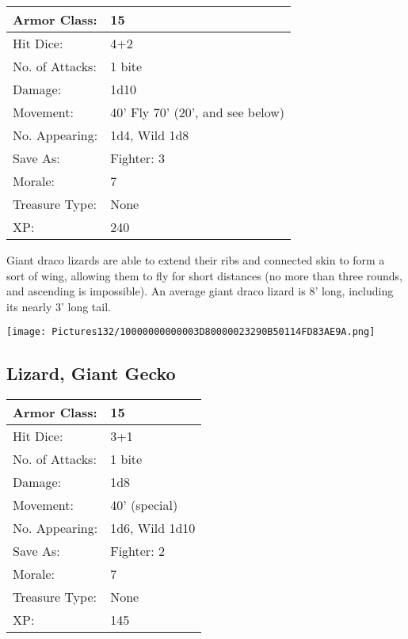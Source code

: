 \documentclass[a4paper,twoside,openany,10pt]{book}
\begin{document}
\begin{multicols}{2}
\begin{tabularx}{0.50\textwidth}{@{}lX@{}}
Armor Class: & 15 \\\hline
Hit Dice: & 4+2 \\\hline
No. of Attacks: & 1 bite \\\hline
Damage: & 1d10 \\\hline
Movement: & 40' Fly 70'
(20', and see below) \\\hline
No. Appearing: & 1d4, Wild 1d8 \\\hline
Save As: & Fighter: 3 \\\hline
Morale: & 7 \\\hline
Treasure Type: & None \\\hline
XP: & 240 \\\hline
\end{tabularx}\medskip

Giant draco lizards are able to extend their ribs and connected skin to
form a sort of wing, allowing them to fly for short distances (no more
than three rounds, and ascending is impossible). An average giant draco
lizard is 8' long, including its nearly
3' long tail.

\begin{center} \texttt{[image: Pictures132/10000000000003D80000023290B50114FD83AE9A.png]} \end{center}


\subsection*{Lizard, Giant Gecko}\label{lizard-giant-gecko}

\begin{tabularx}{0.50\textwidth}{@{}lX@{}}
Armor Class: & 15 \\\hline
Hit Dice: & 3+1 \\\hline
No. of Attacks: & 1 bite \\\hline
Damage: & 1d8 \\\hline
Movement: & 40' (special) \\\hline
No. Appearing: & 1d6, Wild 1d10 \\\hline
Save As: & Fighter: 2 \\\hline
Morale: & 7 \\\hline
Treasure Type: & None \\\hline
XP: & 145 \\\hline
\end{tabularx}\medskip


\end{multicols}
\end{document}
